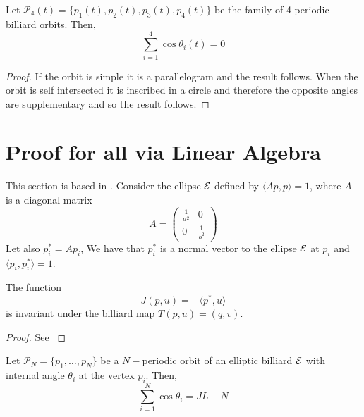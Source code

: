\begin{theorem}\label{thm:c4} Let $\mathcal{P}_4(t)=\{p_1(t),p_2(t),
p_3(t),p_4(t)\}$ 
be the family of 4-periodic billiard orbits.
Then,
\[\sum_{i=1}^4\cos \theta_i(t)=0\]
\label{th:soma_4cossenos}
\end{theorem}

\begin{proof}
If the orbit is simple it is a parallelogram and the result follows.
When the orbit is self intersected it is inscribed in a circle    and therefore the opposite angles are supplementary and so the result follows.
\end{proof}

\section{Proof for all  via Linear Algebra}
This section is based in   \cite{akopyan2020-invariants}.
Consider the ellipse $\mathcal{E}$ defined by $\langle Ap,p\rangle=1$, 
where $A$ is a diagonal matrix 
\[A=\left(\begin{matrix} \frac{1}{a^2} &0\\
0&\frac{1}{b^2}\end{matrix}\right)\]
Let also $p_i^*=Ap_i$, 
We have that $p_i^*$ is a normal vector to the ellipse $\mathcal{E}$ at $p_i$ and $\langle p_i,p_i^*\rangle=1.$
\begin{proposition}
The function
\[ J(p,u)=-\langle p^*,u\rangle\]
is invariant under the billiard map $T(p,u)=(q,v).$
\end{proposition}

\begin{proof}
See \cite{appendix}
\end{proof}

\begin{theorem} \label{th:soma_cossenos} Let   $\mathcal{P}_N=\{p_1,\ldots, p_N\}$ be a $N-$periodic orbit of an elliptic billiard $\mathcal{E}$ with internal angle $\theta_i$ at the vertex $p_i$. Then,
\[\sum_{i=1}^{N}\cos\theta_i=JL-N\]
\end{theorem}


